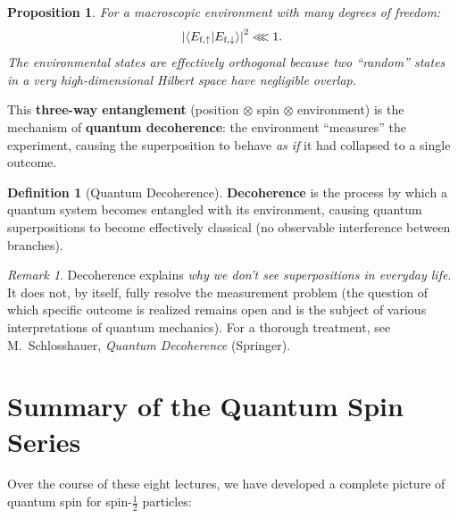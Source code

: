 \documentclass[11pt,a4paper]{article}
\theoremstyle{definition}
\newtheorem{definition}{Definition}[section]
\theoremstyle{plain}
\newtheorem{proposition}{Proposition}[section]
\theoremstyle{remark}
\newtheorem{remark}{Remark}[section]
\begin{document}
\begin{proposition}
    For a macroscopic environment with many degrees of freedom:
    \[
        \left|\braket{E_{\text{f},\uparrow}}{E_{\text{f},\downarrow}}\right|^2 \lll 1.
    \]
    The environmental states are effectively orthogonal because two ``random'' states in a very high-dimensional Hilbert space have negligible overlap.
\end{proposition}

This \textbf{three-way entanglement} (position $\otimes$ spin $\otimes$ environment) is the mechanism of \textbf{quantum decoherence}: the environment ``measures'' the experiment, causing the superposition to behave \emph{as if} it had collapsed to a single outcome.

\begin{definition}[Quantum Decoherence]
    \textbf{Decoherence} is the process by which a quantum system becomes entangled with its environment, causing quantum superpositions to become effectively classical (no observable interference between branches).
\end{definition}

\begin{remark}
    Decoherence explains \emph{why we don't see superpositions in everyday life}. It does not, by itself, fully resolve the measurement problem (the question of which specific outcome is realized remains open and is the subject of various interpretations of quantum mechanics). For a thorough treatment, see M.\ Schlosshauer, \emph{Quantum Decoherence} (Springer).
\end{remark}

\section{Summary of the Quantum Spin Series}

Over the course of these eight lectures, we have developed a complete picture of quantum spin for spin-$\frac{1}{2}$ particles:
\end{document}
